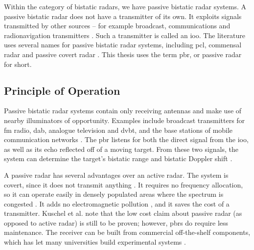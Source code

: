 Within the category of bistatic radars, we have passive bistatic radar systems. A passive bistatic radar does not have a transmitter of its own. It exploits signals transmitted by other sources -- for example broadcast, communications and radionavigation transmitters \citep{griffiths2007,kuschel2019}. Such a transmitter is called an \gls{ioo}. The literature uses several names for passive bistatic radar systems, including \gls{pcl}, commensal radar and passive covert radar \citep{kuschel2019}. This thesis uses the term \gls{pbr}, or passive radar for short.

\subsection{Principle of Operation}
\label{subsec:ch2.pbr.principle}
Passive bistatic radar systems contain only receiving antennas and make use of nearby illuminators of opportunity. Examples include broadcast transmitters for \gls{fm} radio, \gls{dab}, analogue television and \gls{dvbt}, and the base stations of mobile communication networks \citep{kuschel2019}. The \gls{pbr} listens for both the direct signal from the \gls{ioo}, as well as its echo reflected off of a moving target. From these two signals, the system can determine the target's bistatic range and bistatic Doppler shift \citep{kuschel2019}.

A passive radar has several advantages over an active radar. The system is covert, since it does not transmit anything \citep{kuschel2019}. It requires no frequency allocation, so it can operate easily in densely populated areas where the spectrum is congested \citep{kuschel2019}. It adds no electromagnetic pollution \citep{colone2023}, and it saves the cost of a transmitter. Kuschel et al. \citep{kuschel2019} note that the low cost claim about passive radar (as opposed to active radar) is still to be proven; however, \gls{pbr}s do require less maintenance. %
The receiver can be built from commercial off-the-shelf components, which has let many universities build experimental systems \citep{colone2023}.

